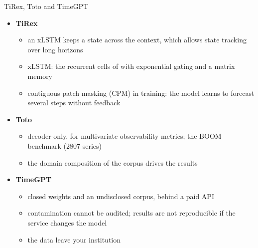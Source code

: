 \begin{frame}{TiRex, Toto and TimeGPT}
\itemsize{\small}
\begin{itemize}
    \item \textbf{TiRex} 
    \begin{itemize}
        \item an xLSTM keeps a state across the context, which allows state tracking over long horizons
        \item xLSTM: the recurrent cells of  with exponential gating and a matrix memory
        \item contiguous patch masking (CPM) in training: the model learns to forecast several steps without feedback
    \end{itemize}
    \item \textbf{Toto} 
    \begin{itemize}
        \item decoder-only, for multivariate observability metrics; the BOOM benchmark (2807 series)
        \item the domain composition of the corpus drives the results
    \end{itemize}
    \item \textbf{TimeGPT} 
    \begin{itemize}
        \item closed weights and an undisclosed corpus, behind a paid API
        \item contamination cannot be audited; results are not reproducible if the service changes the model
        \item the data leave your institution
    \end{itemize}
\end{itemize}
\end{frame}

